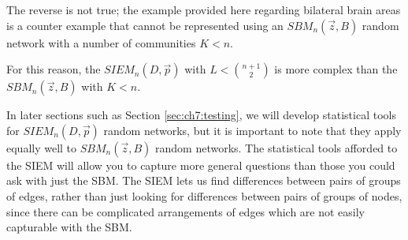 The reverse is not true; the example provided here regarding bilateral brain areas is a counter example that cannot be represented using an $SBM_n(\vec z, B)$ random network with a number of communities $K < n$.

For this reason, the $SIEM_n(D, \vec p)$ with $L < \binom{n+1}{2}$ is more complex than the $SBM_n(\vec z, B)$ with $K < n$.

In later sections such as Section \ref{sec:ch7:testing}, we will develop statistical tools for $SIEM_n(D, \vec p)$ random networks, but it is important to note that they apply equally well to $SBM_n(\vec z, B)$ random networks. The statistical tools afforded to the SIEM will allow you to capture more general questions than those you could ask with just the SBM. The SIEM lets us find differences between pairs of groups of edges, rather than just looking for differences between pairs of groups of nodes, since there can be complicated arrangements of edges which are not easily capturable with the SBM.


\newpage